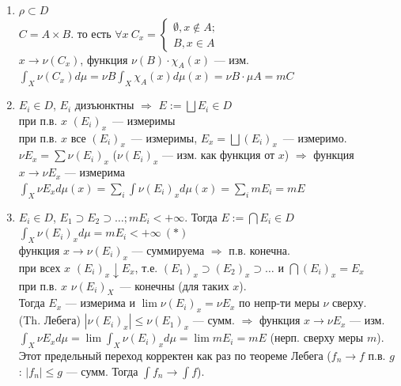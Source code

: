\documentclass[paper=a4, fontsize=17pt]{article}
\begin{document}
		\begin{enumerate}
			\item
				$\rho \subset D$\\
				$C = A \times B$. то есть $\forall x\ C_x = 
                    \begin{cases}
                        \emptyset, x \not\in A;\\
                        B, x \in A
                    \end{cases}$\\
				$x \rightarrow \nu(C_x)$, функция $\nu(B) \cdot \chi_A(x)$ --- изм.\\
				$\int_X \nu(C_x)d\mu = \nu B \int_X \chi_A(x)d\mu(x) = \nu B \cdot \mu A = m C$
			\item
				$E_i \in D$, $E_i$ дизъюнктны $\Rightarrow$ $E := \bigsqcup E_i \in D$\\
				при п.в. $x$ $(E_i)_x$~--- измеримы\\
				при п.в. $x$ все $(E_i)_x$~--- измеримы, $E_x = \bigsqcup (E_i)_x$~--- измеримо.\\
				$\nu E_x = \sum \nu (E_i)_x$ ($\nu (E_i)_x$ --- изм. как функция от $x$) $\Rightarrow$ функция $ x \rightarrow \nu E_x$ --- измерима\\
				$\int_X \nu E_x d\mu(x) = \sum_{i}\int\nu(E_i)_x d\mu(x) = \sum_{i}m E_i = m E$
			\item
				$E_i \in D$, $E_1 \supset E_2 \supset \ldots ; m E_i < +\infty$. Тогда $E := \bigcap E_i \in D$\\
				$\int_X\nu(E_i)_x d\mu = m E_i < +\infty\ (*)$\\
				функция $x \rightarrow \nu(E_i)_x$ --- суммируема $\Rightarrow$ п.в. конечна.\\
				при всех $x$ $(E_i)_x \downarrow E_x$, т.е. $(E_1)_x \supset (E_2)_x \supset \ldots $ и $\bigcap(E_i)_x = E_x$\\
				при п.в. $x$ $\nu(E_i)_X$~--- конечны (для таких $x$).\\
				Тогда $E_x$ --- измерима и $\lim \nu(E_i)_x = \nu E_x$ по непр-ти меры $\nu$ сверху.\\
				(Th. Лебега) $|\nu(E_i)_x| \leq \nu(E_1)_x$ --- сумм. $\Rightarrow$ функция $x \rightarrow \nu E_x$ --- изм.\\
				$\int_X\nu E_x d\mu = \lim\int_X\nu(E_i)_x d\mu = \lim m E_i = m E$ (нерп. сверху меры $m$). Этот предельный переход корректен как раз по теореме Лебега ($f_n \rightarrow f$ п.в. $g$ : $|f_n| \leq g$ --- сумм. Тогда $\int f_n \rightarrow \int f$).\\

\end{enumerate}
\end{document}

